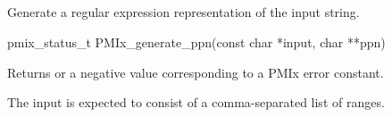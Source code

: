 

\subsection{}

\summary

Generate a regular expression representation of the input string.

\format

\cspecificstart
\begin{codepar}
pmix_status_t PMIx_generate_ppn(const char *input, char **ppn)
\end{codepar}
\cspecificend

\begin{arglist}
\end{arglist}

Returns  or a negative value corresponding to a PMIx error constant.

\descr

The input is expected to consist of a comma-separated list of ranges.



\subsection{}

\summary

